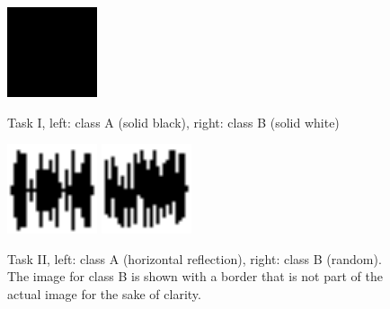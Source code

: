 \documentclass{article}
\begin{document}
\clearpage
{}
\pagestyle{empty}

\clearpage
\begin{figure}[ht]
  \centering
  \includegraphics[width=100px]{solidcolor-example-A.png}
  \hspace{100px}
  {%
    \setlength{\fboxrule}{1pt}%
  }%
  \label{fig:solidcolor-example}
  \caption{Task I, left: class A (solid black), right: class B (solid white)}
\end{figure}

\begin{figure}[ht]
  \centering
  \includegraphics[width=100px]{reflection-example-A.png}
  \hspace{100px}
  \includegraphics[width=100px]{reflection-example-B.png}
  \label{fig:reflection-example}
  \caption{Task II, left: class A (horizontal reflection), right: class B (random). The image for class B is shown with a border that is not part of the actual image for the sake of clarity.}
\end{figure}
\end{document}
